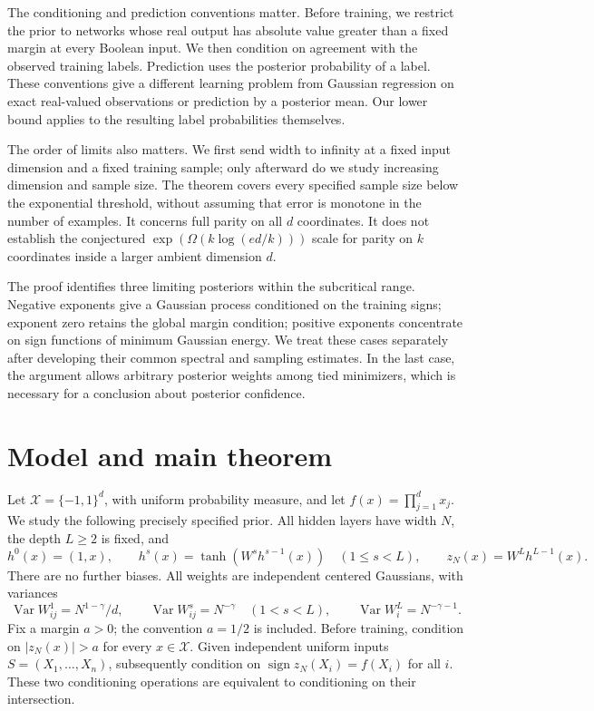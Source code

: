 \documentclass[11pt]{article}
\theoremstyle{remark}\newtheorem{remark}[theorem]{Remark}
\DeclareMathOperator{\Var}{Var}
\DeclareMathOperator{\sign}{sign}
\begin{document}
The conditioning and prediction conventions matter. Before training,
we restrict the prior to networks whose real output has absolute value
greater than a fixed margin at every Boolean input. We then condition
on agreement with the observed training labels. Prediction uses the
posterior probability of a label. These conventions give a different
learning problem from Gaussian regression on exact real-valued
observations or prediction by a posterior mean. Our lower bound applies
to the resulting label probabilities themselves.

The order of limits also matters. We first send width to infinity at a
fixed input dimension and a fixed training sample; only afterward do we
study increasing dimension and sample size. The theorem covers every
specified sample size below the exponential threshold, without assuming
that error is monotone in the number of examples. It concerns full parity
on all $d$ coordinates. It does not establish the conjectured
$\exp(\Omega(k\log(ed/k)))$ scale for parity on $k$ coordinates inside a
larger ambient dimension $d$.

The proof identifies three limiting posteriors within the subcritical
range. Negative exponents give a Gaussian process conditioned on the
training signs; exponent zero retains the global margin condition;
positive exponents concentrate on sign functions of minimum Gaussian
energy. We treat these cases separately after developing their common
spectral and sampling estimates. In the last case, the argument allows
arbitrary posterior weights among tied minimizers, which is necessary
for a conclusion about posterior confidence.

\section{Model and main theorem}
Let $\mathcal X=\{-1,1\}^d$, with uniform probability measure, and let
$f(x)=\prod_{j=1}^d x_j$. We study the following precisely specified prior.
All hidden layers have width $N$, the depth $L\ge2$ is fixed, and
\[
 h^0(x)=(1,x),\qquad h^s(x)=\tanh(W^sh^{s-1}(x))\quad(1\le s<L),
 \qquad z_N(x)=W^Lh^{L-1}(x).
\]
There are no further biases. All weights are independent centered
Gaussians, with variances
\begin{equation}\label{eq:weights}
 \Var W^1_{ij}=N^{1-\gamma}/d,\qquad
 \Var W^s_{ij}=N^{-\gamma}\quad(1<s<L),\qquad
 \Var W^L_i=N^{-\gamma-1}.
\end{equation}
Fix a margin $a>0$; the convention $a=1/2$ is included. Before training,
condition on $|z_N(x)|>a$ for every $x\in\mathcal X$. Given independent
uniform inputs $S=(X_1,\ldots,X_n)$, subsequently condition on
$\sign z_N(X_i)=f(X_i)$ for all $i$. These two conditioning operations
are equivalent to conditioning on their intersection.
\end{document}
